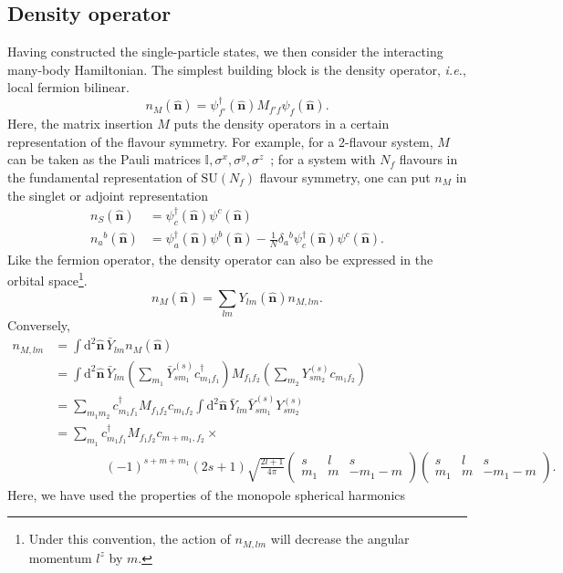 \documentclass{timesjhep}
\begin{document}
\subsection{Density operator}
\label{sec:construct_den}

Having constructed the single-particle states, we then consider the interacting many-body Hamiltonian. The simplest building block is the density operator, \textit{i.e.}, local fermion bilinear. 
\begin{equation}
    n_M(\hat{\mathbf{n}})=\psi_{f'}^\dagger(\hat{\mathbf{n}})M_{f'f}\psi_f(\hat{\mathbf{n}}).
    \label{eq:den_def}
\end{equation}
Here, the matrix insertion $M$ puts the density operators in a certain representation of the flavour symmetry. For example, for a 2-flavour system, $M$ can be taken as the Pauli matrices $\mathbb{I},\sigma^x,\sigma^y,\sigma^z$~; for a system with $N_f$ flavours in the fundamental representation of $\mathrm{SU}(N_f)$ flavour symmetry, one can put $n_M$ in the singlet or adjoint representation 
\begin{align}
    n_S(\hat{\mathbf{n}})&=\psi_{c}^\dagger(\hat{\mathbf{n}})\psi^c(\hat{\mathbf{n}})\nonumber\\ 
    n_a{}^b(\hat{\mathbf{n}})&=\psi_{a}^\dagger(\hat{\mathbf{n}})\psi^b(\hat{\mathbf{n}})-\tfrac{1}{N}\delta_{a}{}^b\psi_c^\dagger(\hat{\mathbf{n}})\psi^c(\hat{\mathbf{n}}).
\end{align} 
Like the fermion operator, the density operator can also be expressed in the orbital space\footnote{Under this convention, the action of $n_{M,lm}$ will decrease the angular momentum $l^z$ by $m$.}. 
\begin{equation}
    n_M(\hat{\mathbf{n}})=\sum_{lm}Y_{lm}(\hat{\mathbf{n}})n_{M,lm}.
    \label{eq:den_decomp}
\end{equation}
Conversely, 
\begin{align}
    n_{M,lm}&=\int\mathrm{d}^2\hat{\mathbf{n}}\,\bar{Y}_{lm}n_M(\hat{\mathbf{n}})\nonumber\\
    &=\int\mathrm{d}^2\hat{\mathbf{n}}\,\bar{Y}_{lm}\left(\sum_{m_1}\bar{Y}^{(s)}_{sm_1}c^\dagger_{m_1f_1}\right)M_{f_1f_2}\left(\sum_{m_2}Y^{(s)}_{sm_2}c_{m_1f_2}\right)\nonumber\\
    &=\sum_{m_1m_2}c^\dagger_{m_1f_1}M_{f_1f_2}c_{m_1f_2}\int\mathrm{d}^2\hat{\mathbf{n}}\,\bar{Y}_{lm}\bar{Y}^{(s)}_{sm_1}Y^{(s)}_{sm_2}\nonumber\\
    &=\sum_{m_1}c^\dagger_{m_1f_1}M_{f_1f_2}c_{m+m_1,f_2}\times\nonumber\\
    &\qquad\qquad(-1)^{s+m+m_1}(2s+1)\sqrt{\frac{2l+1}{4\pi}}\begin{pmatrix}s&l&s\\m_1&m&-m_1-m\end{pmatrix}\begin{pmatrix}s&l&s\\m_1&m&-m_1-m\end{pmatrix}.
    \label{eq:den_mod}
\end{align}
Here, we have used the properties of the monopole spherical harmonics~\cite{Wu1977Monopole,Shnir2005Monopole}
\end{document}
